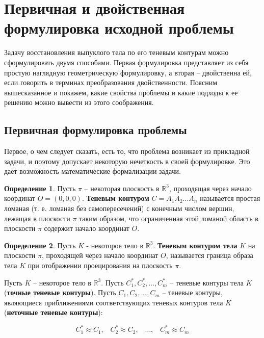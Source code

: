 \documentclass[a4paper, 12pt, titlepage]{article}
\theoremstyle{definition}
\newtheorem{SmartDefinition}{Определение}
\theoremstyle{plain}
\theoremstyle{plain}
\begin{document}
\section{Первичная и двойственная формулировка исходной проблемы}

Задачу восстановления выпуклого тела по его теневым контурам можно
сформулировать двумя способами. Первая формулировка представляет из себя
простую наглядную геометрическую формулировку, а вторая -- двойственна ей, если
говорить в терминах преобразования двойственности. Поясним вышесказанное и
покажем, какие свойства проблемы и какие подходы к ее решению можно вывести из
этого соображения.

\subsection{Первичная формулировка проблемы}

Первое, о чем следует сказать, есть то, что проблема возникает из прикладной
задачи, и поэтому допускает некоторую нечеткость в своей формулировке. Это дает
возможность математические формализации задачи.

\begin{SmartDefinition}
 Пусть $\pi$ -- некоторая плоскость в $\mathbb{R}^{3}$, проходящая через начало
 координат $O = (0, 0, 0)$. \textbf{Теневым контуром}
 $C = A_{1} A_{2} \ldots A_{n}$ называется  простая ломаная (т. е. ломаная без
 самопересечений) с конечным числом вершин, лежащая в плоскости $\pi$ таким
 образом, что ограниченная этой ломаной область в плоскости $\pi$ содержит
 начало координат $O$.
\end{SmartDefinition}

\begin{SmartDefinition}
 Пусть $K$ - некоторое тело в $\mathbb{R}^{3}$. \textbf{Теневым контуром тела}
 $K$ на плоскости $\pi$, проходящей через начало координат $O$, называется
 граница образа тела $K$ при отображении проецирования на плоскость $\pi$.
\end{SmartDefinition}

Пусть $K$ -- некоторое тело в $\mathbb{R}^{3}$. Пусть $C_{1}^{*}, C_{2}^{*},
\ldots, C_{m}^{*}$ -- теневые контуры тела $K$ (\textbf{точные теневые
контуры}). Пусть $C_{1}, C_{2}, \ldots, C_{m}$ -- теневые контуры, являющиеся
приближениями соответствующих теневых контуров тела $K$ (\textbf{неточные
теневые контуры}):

\begin{equation}
 C_{1}^{*} \approx C_{1}, \;\;\;
 C_{2}^{*} \approx C_{2}, \;\;\;
 \ldots, \;\;\;
 C_{m}^{*} \approx C_{m}
\end{equation}
\end{document}
